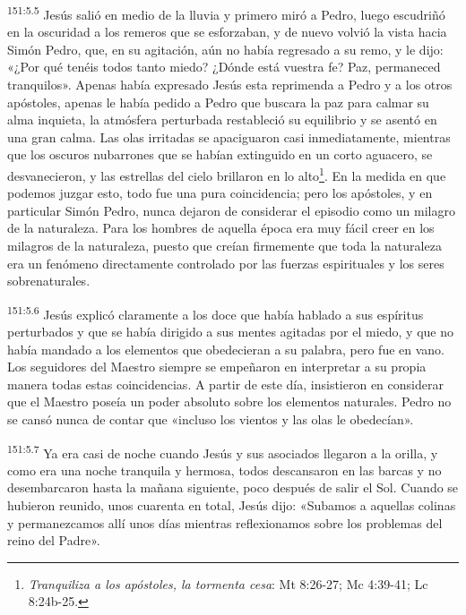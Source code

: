 \par
\textsuperscript{151:5.5} Jesús salió en medio de la lluvia y primero miró a Pedro, luego escudriñó en la oscuridad a los remeros que se esforzaban, y de nuevo volvió la vista hacia Simón Pedro, que, en su agitación, aún no había regresado a su remo, y le dijo: «¿Por qué tenéis todos tanto miedo? ¿Dónde está vuestra fe? Paz, permaneced tranquilos». Apenas había expresado Jesús esta reprimenda a Pedro y a los otros apóstoles, apenas le había pedido a Pedro que buscara la paz para calmar su alma inquieta, la atmósfera perturbada restableció su equilibrio y se asentó en una gran calma. Las olas irritadas se apaciguaron casi inmediatamente, mientras que los oscuros nubarrones que se habían extinguido en un corto aguacero, se desvanecieron, y las estrellas del cielo brillaron en lo alto\footnote{\textit{Tranquiliza a los apóstoles, la tormenta cesa}: Mt 8:26-27; Mc 4:39-41; Lc 8:24b-25.}. En la medida en que podemos juzgar esto, todo fue una pura coincidencia; pero los apóstoles, y en particular Simón Pedro, nunca dejaron de considerar el episodio como un milagro de la naturaleza. Para los hombres de aquella época era muy fácil creer en los milagros de la naturaleza, puesto que creían firmemente que toda la naturaleza era un fenómeno directamente controlado por las fuerzas espirituales y los seres sobrenaturales.

\par
\textsuperscript{151:5.6} Jesús explicó claramente a los doce que había hablado a sus espíritus perturbados y que se había dirigido a sus mentes agitadas por el miedo, y que no había mandado a los elementos que obedecieran a su palabra, pero fue en vano. Los seguidores del Maestro siempre se empeñaron en interpretar a su propia manera todas estas coincidencias. A partir de este día, insistieron en considerar que el Maestro poseía un poder absoluto sobre los elementos naturales. Pedro no se cansó nunca de contar que «incluso los vientos y las olas le obedecían».

\par
\textsuperscript{151:5.7} Ya era casi de noche cuando Jesús y sus asociados llegaron a la orilla, y como era una noche tranquila y hermosa, todos descansaron en las barcas y no desembarcaron hasta la mañana siguiente, poco después de salir el Sol. Cuando se hubieron reunido, unos cuarenta en total, Jesús dijo: «Subamos a aquellas colinas y permanezcamos allí unos días mientras reflexionamos sobre los problemas del reino del Padre».

